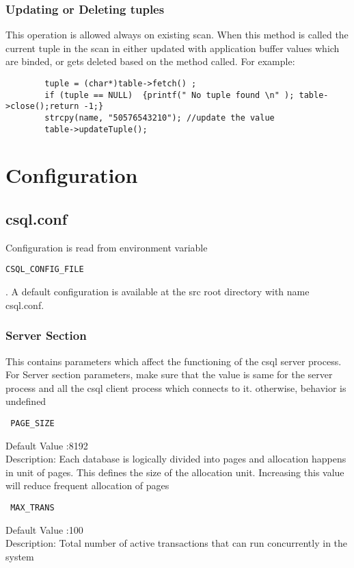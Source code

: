\documentclass[12pt]{article}
\begin{document}
\subsubsection{Updating or Deleting tuples}
\label{updtable}
This operation is allowed always on existing scan. When this method is called the current tuple in the scan in either updated with application buffer values which are binded, or gets deleted based on the method called.
For example:
\begin{verbatim}
        tuple = (char*)table->fetch() ;
        if (tuple == NULL)  {printf(" No tuple found \n" ); table->close();return -1;}
        strcpy(name, "50576543210"); //update the value
        table->updateTuple();
\end{verbatim}

\section{Configuration}
\label{confFile}
\subsection{csql.conf}
\label{csqlconf}
Configuration is read from environment variable \begin{verbatim}CSQL_CONFIG_FILE \end{verbatim}. A default configuration is available at the src root directory with name csql.conf.

\subsubsection{Server Section}
\label{serversection}
This contains parameters which affect the functioning of the csql server process. For Server section parameters, make sure that the value is same for the server process and all the csql client process which connects to it. otherwise, behavior is undefined

\begin{verbatim} PAGE_SIZE \end{verbatim}
Default Value :8192 \\
Description: Each database is logically divided into pages and allocation happens in unit of pages. This defines the size of the allocation unit. Increasing this value will reduce frequent allocation of pages \\


\begin{verbatim} MAX_TRANS \end{verbatim}
Default Value :100 \\
Description: Total number of active transactions that can run concurrently in the system \\
\end{document}
